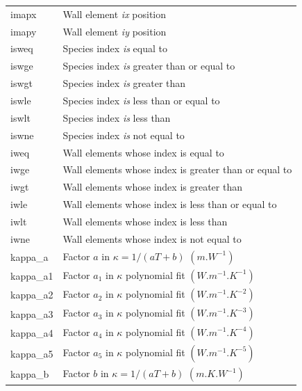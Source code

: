 \documentclass[a4paper,10pt]{report}
\begin{document}
\begin{center}
\begin{longtable}{|l|l|}
    imapx \index{b2plot, imapx}     & Wall element {\em ix} position \\
    imapy \index{b2plot, imapy}     & Wall element {\em iy} position \\
    isweq \index{b2plot, isweq}     & Species index {\em is} equal to \\
    iswge \index{b2plot, iswgt}     & Species index {\em is} greater than or equal to \\
    iswgt \index{b2plot, iswgt}     & Species index {\em is} greater than \\
    iswle \index{b2plot, iswle}     & Species index {\em is} less than or equal to \\
    iswlt \index{b2plot, iswlt}     & Species index {\em is} less than \\
    iswne \index{b2plot, iswne}     & Species index {\em is} not equal to \\
    iweq \index{b2plot, iweq}      & Wall elements whose index is equal to \\
    iwge \index{b2plot, iwge}      & Wall elements whose index is greater than or equal to \\
    iwgt \index{b2plot, iwgt}      & Wall elements whose index is greater than \\
    iwle \index{b2plot, iwle}      & Wall elements whose index is less than or equal to \\
    iwlt \index{b2plot, iwlt}      & Wall elements whose index is less than \\
    iwne \index{b2plot, iwne}      & Wall elements whose index is not equal to \\
    kappa\_a \index{b2plot, kappa\_a}  & Factor $a$ in $\kappa=1/(aT+b)$ $(m.W^{-1})$ \\
    kappa\_a1 \index{b2plot, kappa\_a1} & Factor $a_1$ in $\kappa$ polynomial fit $(W.m^{-1}.K^{-1})$ \\
    kappa\_a2 \index{b2plot, kappa\_a2} & Factor $a_2$ in $\kappa$ polynomial fit $(W.m^{-1}.K^{-2})$ \\
    kappa\_a3 \index{b2plot, kappa\_a3} & Factor $a_3$ in $\kappa$ polynomial fit $(W.m^{-1}.K^{-3})$ \\
    kappa\_a4 \index{b2plot, kappa\_a4} & Factor $a_4$ in $\kappa$ polynomial fit $(W.m^{-1}.K^{-4})$ \\
    kappa\_a5 \index{b2plot, kappa\_a5} & Factor $a_5$ in $\kappa$ polynomial fit $(W.m^{-1}.K^{-5})$ \\
    kappa\_b \index{b2plot, kappa\_b}  & Factor $b$ in $\kappa=1/(aT+b)$ $(m.K.W^{-1})$ \\

\end{longtable}
\end{center}
\end{document}
